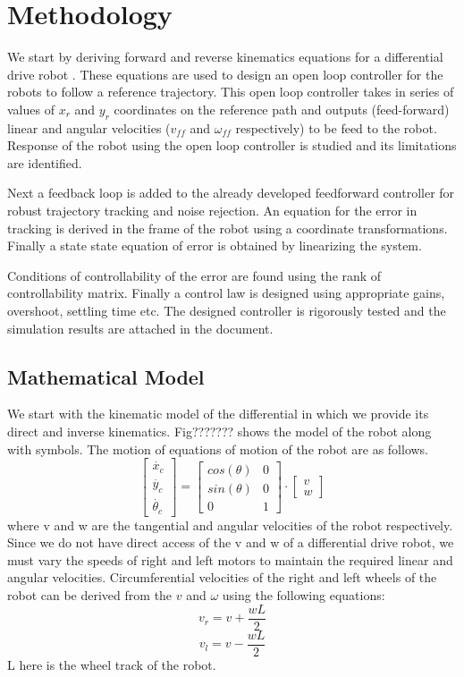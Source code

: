 \documentclass[conference]{IEEEtran}
\begin{document}
\section{Methodology}
We start by deriving forward and reverse kinematics equations for a differential drive robot \cite{de1995modelling}. These equations are used to design an open loop controller for the robots to follow a reference trajectory. This open loop controller takes in series of values of $x_{r}$ and $y_{r}$ coordinates on the reference path and outputs (feed-forward) linear and angular velocities ($v_{ff}$ and $\omega_{ff}$ respectively) to be feed to the robot. Response of the robot using the open loop controller is studied and its limitations are identified.

Next a feedback loop is added to the already developed feedforward controller for robust trajectory tracking and noise rejection. An equation for the error in tracking is derived in the frame of the robot using a coordinate transformations. Finally a state state equation of error is obtained by linearizing the system.

Conditions of controllability of the error are found using the rank of controllability matrix. Finally a control law is designed using appropriate gains, overshoot, settling time etc. The designed controller is rigorously tested and the simulation results are attached in the document.
\subsection{Mathematical Model}
We start with the kinematic model of the differential in which we provide its direct and inverse kinematics. Fig??????? shows the model of the robot along with symbols.
The motion of equations of motion of the robot are as follows.
\begin{equation}\label{eq}
\begin{bmatrix}
\dot{x_{c}}\\ 
\dot{y_{c}}\\ 
\dot{\theta_{c}}
\end{bmatrix}
=
\begin{bmatrix}
cos(\theta) & 0\\ 
sin(\theta) & 0\\
0 & 1
\end{bmatrix}
\cdot 
\begin{bmatrix}
v\\
w
\end{bmatrix}
\end{equation}
where v and w are the tangential and angular velocities of the robot respectively.
Since we do not have direct access of the v and w of a differential drive robot, we must vary the speeds of right and left motors to maintain the required linear and angular velocities. 
Circumferential velocities of the right and left wheels of the robot can be derived from the $v$ and $\omega$ using the following equations:
\begin{equation}\label{eq}
v_{r} = v + \frac{wL}{2}
\end{equation}
\begin{equation}\label{eq}
v_{l} = v - \frac{wL}{2}
\end{equation}
L here is the wheel track of the robot.
\end{document}
